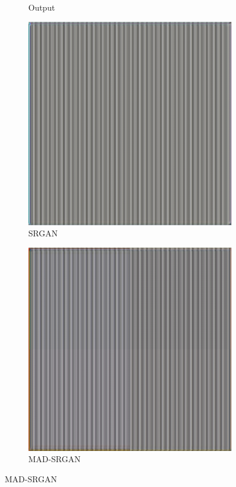 \documentclass[12pt,a4paper]{article}
\begin{document}
\begin{figure}[H]
\begin{subfigure}{0.2\textwidth}
                \caption*{Output}
            \end{subfigure}
            \enspace
            \begin{subfigure}{0.2\textwidth}
                \includegraphics[width=\textwidth]{images/samples/aliasing-2-srgan.png}
                \caption*{SRGAN}
            \end{subfigure}
            \enspace
            \begin{subfigure}{0.2\textwidth}
                \includegraphics[width=\textwidth]{images/samples/aliasing-2-mad-srgan.png}
                \caption*{MAD-SRGAN}
            \end{subfigure}
        \end{figure}
\end{document}
